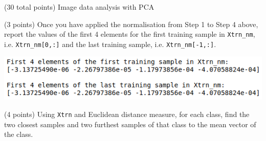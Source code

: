 \documentclass[12pt]{article}
\begin{document}
\clearpage
%
%

\begin{question}{(30 total points) Image data analysis with PCA}

  
  

  
  \medskip

  \begin{subquestion}{(3 points)
      Once you have applied the normalisation from Step 1 to Step 4 above,
      report the values of the first 4 elements for the first training
      sample in \texttt{Xtrn\_nm},
      i.e. \texttt{Xtrn\_nm[0,:]} and the last training sample,
      i.e. \texttt{Xtrn\_nm[-1,:]}.
    } \label{Q1.1}
    

      \begin{answerbox}{10em}
         \includegraphics[width=1\textwidth]{images/q11.png}
      \end{answerbox}
  


   \end{subquestion}
   \begin{subquestion}{(4 points)
      Using {\tt Xtrn} and Euclidean distance
      measure, for each class,
      find the two closest samples and two furthest
      samples of that class to the mean vector of the class.
    }  \label{Q1.2}





\end{subquestion}
\end{question}
\end{document}
